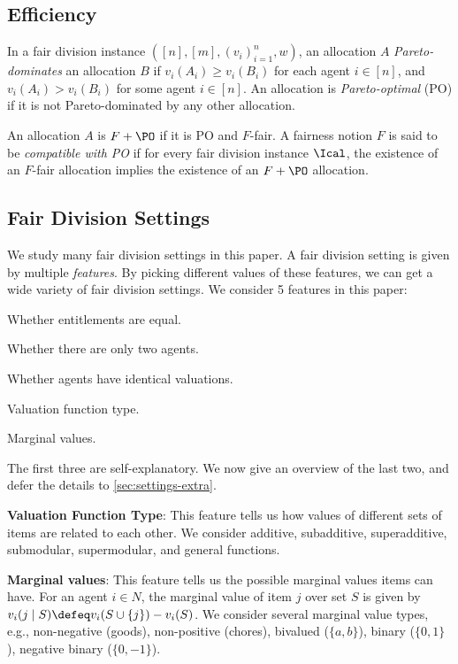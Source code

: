 \subsection{Efficiency}
\label{sec:prelims:efficiency}

In a fair division instance $([n], [m], (v_i)_{i=1}^n, w)$,
an allocation $A$ \emph{Pareto-dominates} an allocation $B$ if
$v_i(A_i) \ge v_i(B_i)$ for each agent $i \in [n]$,
and $v_i(A_i) > v_i(B_i)$ for some agent $i \in [n]$.
An allocation is \emph{Pareto-optimal} (PO) if it is not Pareto-dominated by any other allocation.

An allocation $A$ is $F+\PO$ if it is PO and $F$-fair.
A fairness notion $F$ is said to be \emph{compatible with PO} if
for every fair division instance $\Ical$, the existence of an $F$-fair allocation
implies the existence of an $F+\PO$ allocation.

\subsection{Fair Division Settings}
\label{sec:settings}

We study many fair division settings in this paper.
A fair division setting is given by multiple \emph{features}.
By picking different values of these features, we can get a wide variety of fair division settings.
We consider 5 features in this paper:
\begin{tightenum}
\item Whether entitlements are equal.
\item Whether there are only two agents.
\item Whether agents have identical valuations.
\item Valuation function type.
\item Marginal values.
\end{tightenum}
The first three are self-explanatory. We now give an overview of the last two,
and defer the details to \cref{sec:settings-extra}.

\textbf{Valuation Function Type}:
This feature tells us how values of different sets of items are related to each other.
We consider additive, subadditive, superadditive, submodular, supermodular, and general functions.

\textbf{Marginal values}:
This feature tells us the possible marginal values items can have.
For an agent $i \in N$, the marginal value of item $j$ over set $S$
is given by $v_i(j \mid S) \defeq v_i(S \cup \{j\}) - v_i(S)$.
We consider several marginal value types, e.g., non-negative (goods), non-positive (chores),
bivalued ($\{a, b\}$), binary ($\{0, 1\}$), negative binary ($\{0, -1\}$).
